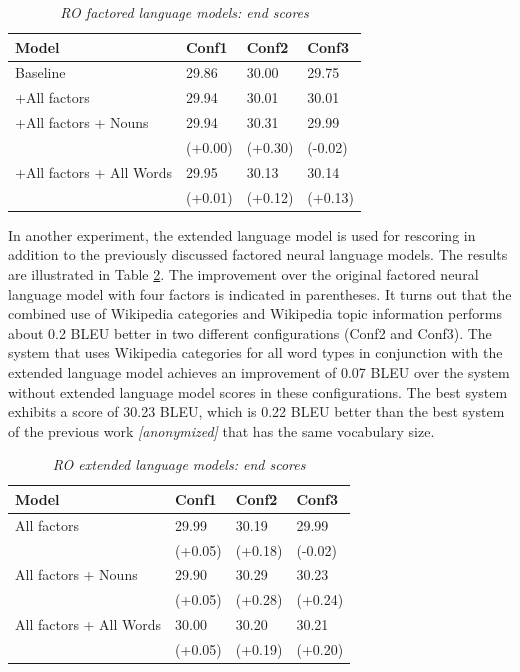 \documentclass[a4paper]{article}
\newcommand{\anony}[1]{\textit{[anonymized]}}
\begin{document}
\begin{table}
\caption{\it RO factored language models: end scores}
\vspace{2mm}
\centering
  \begin{tabular}{llll}
  	\hline
  	Model                    & Conf1   & Conf2   & Conf3   \\ \hline\hline
  	Baseline                 & 29.86   & 30.00   & 29.75   \\
  	+All factors             & 29.94   & 30.01   & 30.01   \\ \hline
  	+All factors + Nouns     & 29.94   & 30.31   & 29.99   \\
  	                         & (+0.00) & (+0.30) & (-0.02) \\
  	+All factors + All Words & 29.95   & 30.13   & 30.14   \\
  	                         & (+0.01) & (+0.12) & (+0.13)
  \end{tabular}
  \label{tb:ro-factored-combi}
\end{table}

In another experiment, the extended language model is used for rescoring in addition to the previously discussed factored neural language models. The results are illustrated in Table \ref{tb:ro-extended}. The improvement over the original factored neural language model with four factors is indicated in parentheses. It turns out that the combined use of Wikipedia categories and Wikipedia topic information performs about 0.2 BLEU better in two different configurations (Conf2 and Conf3). The system that uses Wikipedia categories for all word types in conjunction with the extended language model achieves an improvement of 0.07 BLEU over the system without extended language model scores in these configurations.
The best system exhibits a score of 30.23 BLEU, which is 0.22 BLEU better than the best system of the previous work \anony{\cite{niehuesusing}} that has the same vocabulary size.

\begin{table}
\caption{\it RO extended language models: end scores}
\vspace{2mm}
\centering
  \begin{tabular}{llll}
  	\hline
  	Model                   & Conf1   & Conf2   & Conf3   \\ \hline\hline
  	All factors             & 29.99   & 30.19   & 29.99   \\
  	                        & (+0.05) & (+0.18) & (-0.02) \\
  	All factors + Nouns     & 29.90   & 30.29   & 30.23   \\
  	                        & (+0.05) & (+0.28) & (+0.24) \\
  	All factors + All Words & 30.00   & 30.20   & 30.21   \\
  	                        & (+0.05) & (+0.19) & (+0.20)
  \end{tabular}
  \label{tb:ro-extended}
\end{table}
\end{document}
